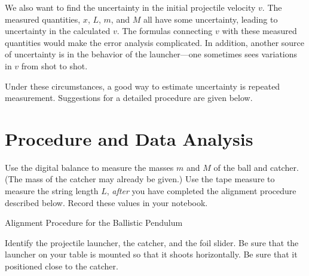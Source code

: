 We also want to find the uncertainty in the initial projectile
velocity $v$.  The measured quantities, $x$, $L$, $m$, and $M$ all
have some uncertainty, leading to uncertainty in the calculated $v$.
The formulas connecting $v$ with these measured quantities would make
the error analysis complicated.  In addition, another source of
uncertainty is in the behavior of the launcher---one sometimes sees
variations in $v$ from shot to shot.

Under these circumstances, a good way to estimate 
uncertainty is repeated measurement.
Suggestions for a detailed
procedure are given below.

%



\section*{Procedure and Data Analysis}

\be



\item Use the digital balance to measure the masses $m$ and $M$ of the
ball and catcher.  (The mass of the catcher may already be given.) 
Use the tape measure to measure the string length
$L$, {\it after} you have completed the alignment procedure described
below. Record these values in your notebook.

\item  Alignment Procedure for the Ballistic Pendulum

Identify the projectile launcher, the catcher, and the foil slider.
Be sure that the launcher on your table is mounted so that it shoots
horizontally.  Be sure that it positioned close to the catcher.


